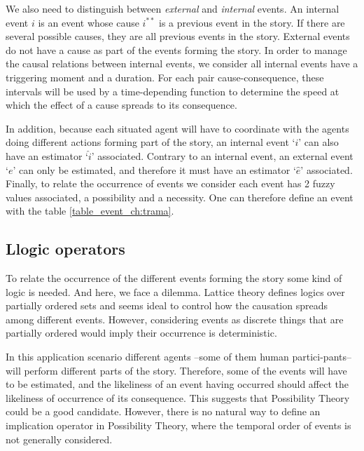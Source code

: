 \documentclass[
		twoside,openright,titlepage,numbers=noenddot,manychapters,
		headinclude,%
                footinclude=false,cleardoublepage=empty,
                BCOR=5mm,
		fontsize=11pt, %
                 enabledeprecatedfontcommands]{scrreprt}
\begin{document}
We also need to distinguish between \emph{external} and \emph{internal} events. An internal event $i$ is an event whose cause $i^{**}$ is a previous event in the story. If there are several possible causes, they are all previous events in the story. External events do not have a cause as part of the events forming the story. In order to manage the causal relations between internal events, we consider all internal events have a triggering moment and a duration. For each pair cause-consequence, these intervals will be used by a time-depending function to determine the speed at which the effect of a cause spreads to its consequence.

In addition, because each situated agent will have to coordinate with the agents doing different actions forming part of the story, an internal event `$i$’ can also have an estimator ‘$\hat{i}$’ associated. Contrary to an internal event, an external event ‘$e$’ can only be estimated, and therefore it must have an estimator ‘$\hat{e}$’ associated. 
Finally, to relate the occurrence of events we consider each event has 2 fuzzy values associated, a possibility and a necessity. One can therefore define an event with the  table \ref{table_event_ch:trama}.


\subsection{Llogic operators}
\label{llogic_oper}
To relate the occurrence of the different events forming the story some kind of logic is needed. And here, we face a dilemma. Lattice theory defines logics over partially ordered sets and seems ideal to control how the causation spreads among different events. However, considering  events as discrete things that are partially ordered would imply their occurrence is deterministic. 

In this application scenario different agents –some of them human partici-pants-- will perform different parts of the story. Therefore, some of the events will have to be estimated, and the likeliness of an event having occurred should affect the likeliness of occurrence of its consequence. This suggests that Possibility Theory \cite[]{zadeh1999fuzzy} could be a good candidate. However, there is no natural way to define an implication operator in Possibility Theory, where the temporal order of events is not generally considered. %
\end{document}
